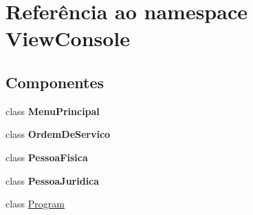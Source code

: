 \hypertarget{namespace_view_console}{}\section{Referência ao namespace View\+Console}
\label{namespace_view_console}
\subsection*{Componentes}
\begin{DoxyCompactItemize}
\item 
class {\bfseries Menu\+Principal}
\item 
class {\bfseries Ordem\+De\+Servico}
\item 
class {\bfseries Pessoa\+Fisica}
\item 
class {\bfseries Pessoa\+Juridica}
\item 
class \hyperlink{class_view_console_1_1_program}{Program}
\end{DoxyCompactItemize}
